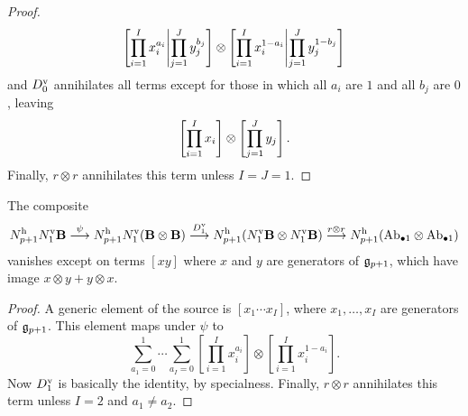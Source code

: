 \documentclass[10pt]{article}
\begin{document}
\begin{Lie Steenrods satisfy the Adem relation}
\begin{proof}
\[\left[\prod_{i=1}^Ix_i^{a_i}\middle|\prod_{\smash{j=1}}^Jy_j^{b_j}\right]\otimes
\left[\prod_{i=1}^Ix_i^{1-a_i}\middle|\prod_{\smash{j=1}}^Jy_j^{1-b_j}\right]\]
and $D_0^\textup{v}$ annihilates all terms except for those in which all $a_i$ are $1$ and all $b_j$ are $0$, leaving
\[\left[\prod_{i=1}^Ix_i\right]\otimes
\left[\prod_{\smash{j=1}}^Jy_j\right].\]
Finally, $r\otimes r$ annihilates this term unless $I=J=1$.
\end{proof}
\begin{lem}\label{secondCompositeLemma}
The composite
\[N_{p+1}^\textup{h}N_1^\textup{v}\textbf{B}\overset{\psi}{\to} N_{p+1}^\textup{h}N_1^\textup{v}(\textbf{B}\otimes\textbf{B})\overset{D_1^\textup{v}}{\to} N_{p+1}^\textup{h}(N_1^\textup{v}\textbf{B}\otimes N_1^\textup{v}\textbf{B})\overset{r\otimes r}{\to}N^\textup{h}_{p+1}(\textup{Ab}_{\bullet 1}\otimes \textup{Ab}_{\bullet 1})\]
vanishes except on terms $[xy]$ where $x$ and $y$ are generators of $\frakg_{p+1}$, which have image $x\otimes y+y\otimes x$.
\end{lem}
\begin{proof}
A generic element of the source is $[x_1\cdots x_I]$, where $x_1,\ldots,x_I$ are generators of $\frakg_{p+1}$. This element maps under $\psi$ to
\[\sum_{a_1=0}^1\cdots \sum_{a_I=0}^1
\left[\prod_{i=1}^Ix_i^{a_i}\right]\otimes
\left[\prod_{i=1}^Ix_i^{1-a_i}\right].\]
Now $D_1^\textup{v}$ is basically the identity, by specialness.
Finally, $r\otimes r$ annihilates this term unless $I=2$ and $a_1\neq a_2$.
\end{proof}


\end{Lie Steenrods satisfy the Adem relation}
\end{document}
